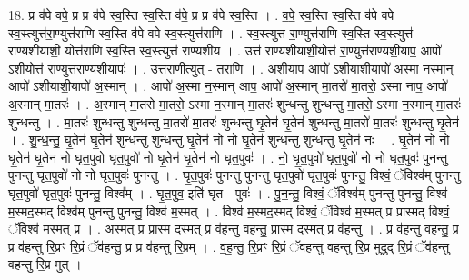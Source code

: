 \documentclass[17pt]{extarticle}
\begin{document}
18. प्र व॑पे वपे॒ प्र प्र व॑पे स्व॒स्ति स्व॒स्ति व॑पे॒ प्र प्र व॑पे स्व॒स्ति । . व॒पे॒ स्व॒स्ति स्व॒स्ति व॑पे वपे स्व॒स्त्युत्त॑रा॒ण्युत्त॑राणि स्व॒स्ति व॑पे वपे स्व॒स्त्युत्त॑राणि । . स्व॒स्त्युत्त॑ रा॒ण्युत्त॑राणि स्व॒स्ति स्व॒स्त्युत्त॑ राण्यशीयाशी॒ योत्त॑राणि स्व॒स्ति स्व॒स्त्युत्त॑ राण्यशीय । . उत्त॑ राण्यशीयाशी॒योत्त॑ रा॒ण्युत्त॑राण्यशी॒याप॒ आपो॑ ऽशी॒योत्त॑ रा॒ण्युत्त॑राण्यशी॒यापः॑ । . उत्त॑रा॒णीत्युत् - त॒रा॒णि॒ । . अ॒शी॒याप॒ आपो॑ ऽशीयाशी॒यापो॑ अ॒स्मा न॒स्मान् आपो॑ ऽशीयाशी॒यापो॑ अ॒स्मान् । . आपो॑ अ॒स्मा न॒स्मान् आप॒ आपो॑ अ॒स्मान् मा॒तरो॑ मा॒तरो॒ ऽस्मा नाप॒ आपो॑ अ॒स्मान् मा॒तरः॑ । . अ॒स्मान् मा॒तरो॑ मा॒तरो॒ ऽस्मा न॒स्मान् मा॒तरः॑ शुन्धन्तु शुन्धन्तु मा॒तरो॒ ऽस्मा न॒स्मान् मा॒तरः॑ शुन्धन्तु । . मा॒तरः॑ शुन्धन्तु शुन्धन्तु मा॒तरो॑ मा॒तरः॑ शुन्धन्तु घृ॒तेन॑ घृ॒तेन॑ शुन्धन्तु मा॒तरो॑ मा॒तरः॑ शुन्धन्तु घृ॒तेन॑ । . शु॒न्ध॒न्तु॒ घृ॒तेन॑ घृ॒तेन॑ शुन्धन्तु शुन्धन्तु घृ॒तेन॑ नो नो घृ॒तेन॑ शुन्धन्तु शुन्धन्तु घृ॒तेन॑ नः । . घृ॒तेन॑ नो नो घृ॒तेन॑ घृ॒तेन॑ नो घृत॒पुवो॑ घृत॒पुवो॑ नो घृ॒तेन॑ घृ॒तेन॑ नो घृत॒पुवः॑ । . नो॒ घृ॒त॒पुवो॑ घृत॒पुवो॑ नो नो घृत॒पुवः॑ पुनन्तु पुनन्तु घृत॒पुवो॑ नो नो घृत॒पुवः॑ पुनन्तु । . घृ॒त॒पुवः॑ पुनन्तु पुनन्तु घृत॒पुवो॑ घृत॒पुवः॑ पुनन्तु॒ विश्वं॒ ॅविश्व॑म् पुनन्तु घृत॒पुवो॑ घृत॒पुवः॑ पुनन्तु॒ विश्व᳚म् । . घृ॒त॒पुव॒ इति॑ घृत - पुवः॑ । . पु॒न॒न्तु॒ विश्वं॒ ॅविश्व॑म् पुनन्तु पुनन्तु॒ विश्व॑ म॒स्मद॒स्मद् विश्व॑म् पुनन्तु पुनन्तु॒ विश्व॑ म॒स्मत् । . विश्व॑ म॒स्मद॒स्मद् विश्वं॒ ॅविश्व॑ म॒स्मत् प्र प्रास्मद् विश्वं॒ ॅविश्व॑ म॒स्मत् प्र । . अ॒स्मत् प्र प्रास्म द॒स्मत् प्र व॑हन्तु वहन्तु॒ प्रास्म द॒स्मत् प्र व॑हन्तु । . प्र व॑हन्तु वहन्तु॒ प्र प्र व॑हन्तु रि॒प्रꣳ रि॒प्रं ॅव॑हन्तु॒ प्र प्र व॑हन्तु रि॒प्रम् । . व॒ह॒न्तु॒ रि॒प्रꣳ रि॒प्रं ॅव॑हन्तु वहन्तु रि॒प्र मुदुद् रि॒प्रं ॅव॑हन्तु वहन्तु रि॒प्र मुत् । \newline
\end{document}
